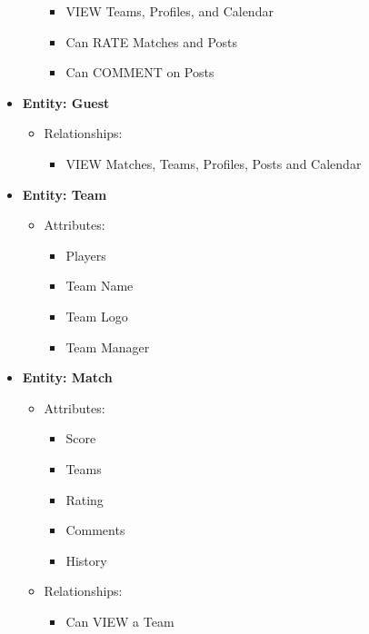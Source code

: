 \documentclass{article}
\begin{document}
\begin{itemize}
\begin{itemize}
\begin{itemize}
                    \item VIEW Teams, Profiles, and Calendar
                    \item Can RATE Matches and Posts
                    \item Can COMMENT on Posts
                \end{itemize}
        \end{itemize}
    \item \textbf{Entity: Guest}
        \begin{itemize}
            \item Relationships:
                \begin{itemize}
                    \item VIEW Matches, Teams, Profiles, Posts and Calendar
                \end{itemize}
        \end{itemize}
    \item \textbf{Entity: Team}
        \begin{itemize}
            \item Attributes:
                \begin{itemize}
                    \item Players
                    \item Team Name
                    \item Team Logo
                    \item Team Manager
                \end{itemize}
        \end{itemize}
    \item \textbf{Entity: Match}
        \begin{itemize}
            \item Attributes:
                \begin{itemize}
                    \item Score
                    \item Teams
                    \item Rating
                    \item Comments
                    \item History
                \end{itemize}
            \item Relationships:
                \begin{itemize}
                    \item Can VIEW a Team

\end{itemize}
\end{itemize}
\end{itemize}
\end{document}
